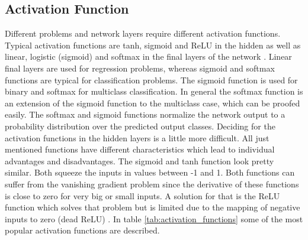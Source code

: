 \subsection{Activation Function}
Different problems and network layers require different activation functions. Typical activation functions are tanh, sigmoid and ReLU in the hidden as well as linear, logistic (sigmoid) and softmax in the final layers of the network \cite{Brownlee2021}. Linear final layers are used for regression problems, whereas sigmoid and softmax functions are typical for classification problems. The sigmoid function is used for binary and softmax for multiclass classification. In general the softmax function is an extension of the sigmoid function to the multiclass case, which can be proofed easily. The softmax and sigmoid functions normalize the network output to a probability distribution over the predicted output classes.  Deciding for the activation functions in the hidden layers is a little more difficult. All just mentioned functions have different characteristics which lead to individual advantages and disadvantages. The sigmoid and tanh function look pretty similar. Both squeeze the inputs in values between -1 and 1. Both functions can suffer from the vanishing gradient problem since the derivative of these functions is close to zero for very big or small inputs. A solution for that is the ReLU function which solves that problem but is limited due to the mapping of negative inputs to zero (dead ReLU) \cite{Brownlee2021}. In table \ref{tab:activation_functions} some of the most popular activation functions are described. \newline
\newline



